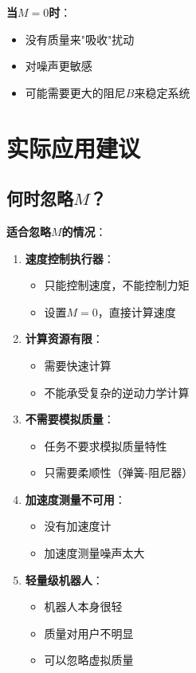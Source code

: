 \documentclass[12pt,a4paper]{article}
\begin{document}
\textbf{当$M = 0$时}：
\begin{itemize}
\item 没有质量来"吸收"扰动
\item 对噪声更敏感
\item 可能需要更大的阻尼$B$来稳定系统
\end{itemize}

\section{实际应用建议}

\subsection{何时忽略$M$？}

\textbf{适合忽略$M$的情况}：
\begin{enumerate}
\item \textbf{速度控制执行器}：
\begin{itemize}
\item 只能控制速度，不能控制力矩
\item 设置$M = 0$，直接计算速度
\end{itemize}

\item \textbf{计算资源有限}：
\begin{itemize}
\item 需要快速计算
\item 不能承受复杂的逆动力学计算
\end{itemize}

\item \textbf{不需要模拟质量}：
\begin{itemize}
\item 任务不要求模拟质量特性
\item 只需要柔顺性（弹簧-阻尼器）
\end{itemize}

\item \textbf{加速度测量不可用}：
\begin{itemize}
\item 没有加速度计
\item 加速度测量噪声太大
\end{itemize}

\item \textbf{轻量级机器人}：
\begin{itemize}
\item 机器人本身很轻
\item 质量对用户不明显
\item 可以忽略虚拟质量
\end{itemize}
\end{enumerate}
\end{document}
